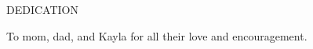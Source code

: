 \newpage
{}

\begin{center}
DEDICATION
\end{center}

\begin{center}
To mom, dad, and Kayla for all their love and encouragement.
\end{center}
